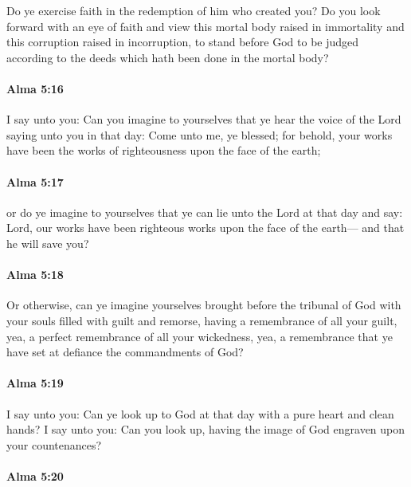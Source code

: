 			Do ye exercise faith in the redemption of him who created you?
			Do you look forward with an eye of faith
			and view this mortal body raised in immortality
			and this corruption raised in incorruption,
			to stand before God to be judged according to the deeds
			which hath been done in the mortal body?

		\paragraph{Alma 5:16} %
			\label{ALMA-5-16}

			I say unto you:
			Can you imagine to yourselves
			that ye hear the voice of the Lord saying unto you in that day:
			Come unto me, ye blessed;
			for behold, your works have been the works of righteousness
			upon the face of the earth;

		\paragraph{Alma 5:17} %
			\label{ALMA-5-17}

			or do ye imagine to yourselves
			that ye can lie unto the Lord at that day and say:
			Lord, our works have been righteous works upon the face of the earth---
			and that he will save you?

		\paragraph{Alma 5:18} %
			\label{ALMA-5-18}

			Or otherwise, can ye imagine yourselves brought before the tribunal of God
			with your souls filled with guilt and remorse,
			having a remembrance of all your guilt,
			yea, a perfect remembrance of all your wickedness,
			yea, a remembrance that ye have set at defiance the commandments of God?

		\paragraph{Alma 5:19} %
			\label{ALMA-5-19}

			I say unto you:
			Can ye look up to God at that day
			with a pure heart and clean hands?
			I say unto you:
			Can you look up,
			having the image of God engraven upon your countenances?

		\paragraph{Alma 5:20} %
			\label{ALMA-5-20}

